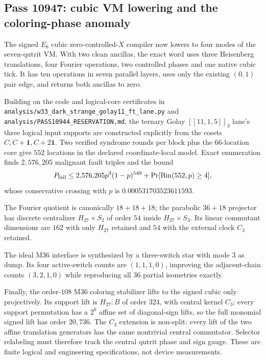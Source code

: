 \subsection{Pass 10947: cubic VM lowering and the coloring-phase anomaly}

The signed $E_6$ cubic zero-controlled-$X$ compiler now lowers to four modes
of the seven-qutrit VM.  With two clean ancillas, the exact word uses three
Heisenberg translations, four Fourier operations, two controlled phases and
one native cubic tick.  It has ten operations in seven parallel layers, uses
only the existing $(0,1)$ pair edge, and returns both ancillas to zero.

Building on the code and logical-core certificates in
\texttt{analysis/w33\_dark\_strange\_golay11\_ft\_lane.py} and
\texttt{analysis/PASS10944\_RESERVATION.md}, the ternary Golay
$[[11,1,5]]_3$ lane's three logical input supports
are constructed explicitly from the cosets $C,C+\mathbf1,C+2\mathbf1$.
Two verified syndrome rounds per block plus the $66$-location core give $552$
locations in the declared coordinate-local model.  Exact enumeration finds
$2{,}576{,}205$ malignant fault triples and the bound
\[
 P_{\rm fail}\le 2{,}576{,}205p^3(1-p)^{549}
 +\Pr[\operatorname{Bin}(552,p)\ge4],
\]
whose conservative crossing with $p$ is $0.000531703523611593$.

The Fourier quotient is canonically $18+18+18$; the parabolic $36+18$
projector has discrete centralizer $H_{27}\times S_2$ of order $54$ inside
$H_{27}\times S_3$.  Its linear commutant dimensions are $162$ with only
$H_{27}$ retained and $54$ with the external clock $C_3$ retained.

The ideal M36 interface is synthesized by a three-switch star with mode $3$
as dump.  Its four active-switch counts are $(1,1,1,0)$, improving the
adjacent-chain counts $(3,2,1,0)$ while reproducing all $36$ partial
isometries exactly.

Finally, the order-$108$ M36 coloring stabilizer lifts to the signed cubic only
projectively.  Its support lift is $H_{27}{:}B$ of order $324$, with central
kernel $C_3$; every support permutation has a $2^6$ affine set of diagonal-sign
lifts, so
the full monomial signed lift has order $20{,}736$.  The $C_3$ extension is
non-split: every lift of the two affine translation generators has the same
nontrivial central commutator.  Selector relabeling must therefore track the
central qutrit phase and sign gauge.  These are finite logical and engineering
specifications, not device measurements.
